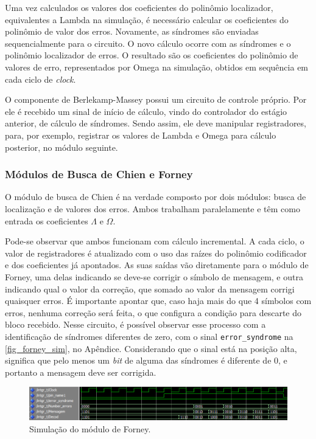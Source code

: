 	Uma vez calculados os valores dos coeficientes do polinômio localizador, equivalentes a Lambda na simulação, é necessário calcular os coeficientes do polinômio de valor dos erros. Novamente, as síndromes são enviadas sequencialmente para o circuito. O novo cálculo ocorre com as síndromes e o polinômio localizador de erros. O resultado são os coeficientes do polinômio de valores de erro, representados por Omega na simulação, obtidos em sequência em cada ciclo de \textit{clock}.

	O componente de Berlekamp-Massey possui um circuito de controle próprio. Por ele é recebido um sinal de início de cálculo, vindo do controlador do estágio anterior, de cálculo de síndromes. Sendo assim, ele deve manipular registradores, para, por exemplo, registrar os valores de Lambda e Omega para cálculo posterior, no módulo seguinte.

	\subsubsection{Módulos de Busca de Chien e Forney}

	O módulo de busca de Chien é na verdade composto por dois módulos: busca de localização e de valores dos erros. Ambos trabalham paralelamente e têm como entrada os coeficientes $\Lambda$ e $\Omega$.

	Pode-se observar que ambos funcionam com cálculo incremental. A cada ciclo, o valor de registradores é atualizado com o uso das raízes do polinômio codificador e dos coeficientes já apontados. As suas saídas vão diretamente para o módulo de Forney, uma delas indicando se deve-se corrigir o símbolo de mensagem, e outra indicando qual o valor da correção, que somado ao valor da mensagem corrigi quaisquer erros. É importante apontar que, caso haja mais do que 4 símbolos com erros, nenhuma correção será feita, o que configura a condição para descarte do bloco recebido. Nesse circuito, é possível observar esse processo com a identificação de síndromes diferentes de zero, com o sinal \texttt{error\_syndrome} na \autoref{fig_forney_sim}, no Apêndice. Considerando que o sinal está na posição alta, significa que pelo menos um \textit{bit} de alguma das síndromes é diferente de 0, e portanto a mensagem deve ser corrigida.

	\begin{figure}[!htb]
		\caption{\label{fig_forney_sim}Simulação do módulo de Forney.}
		\centering
		\includegraphics[width=1\textwidth]{RS/Sim_forney.PNG}
	\end{figure}


